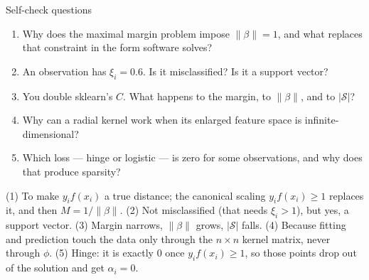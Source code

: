 \documentclass[aspectratio=169,11pt]{beamer}
\begin{document}
\begin{frame}{Self-check questions}
  \scriptsize
  \begin{readme}
    \begin{enumerate}
      \item Why does the maximal margin problem impose $\|\beta\|=1$, and what
            replaces that constraint in the form software solves?
      \item An observation has $\xi_i = 0.6$. Is it misclassified? Is it a
            support vector?
      \item You double sklearn's $C$. What happens to the margin, to
            $\|\beta\|$, and to $|\mathcal S|$?
      \item Why can a radial kernel work when its enlarged feature space is
            infinite-dimensional?
      \item Which loss --- hinge or logistic --- is zero for some observations,
            and why does that produce sparsity?
    \end{enumerate}
  \end{readme}
  \begin{takeaway}[Answers]
    (1) To make $y_if(x_i)$ a true distance; the canonical scaling
    $y_if(x_i)\ge1$ replaces it, and then $M=1/\|\beta\|$.
    (2) Not misclassified (that needs $\xi_i>1$), but yes, a support vector.
    (3) Margin narrows, $\|\beta\|$ grows, $|\mathcal S|$ falls.
    (4) Because fitting and prediction touch the data only through the
    $n\times n$ kernel matrix, never through $\phi$.
    (5) Hinge: it is exactly $0$ once $y_if(x_i)\ge1$, so those points drop out
    of the solution and get $\alpha_i=0$.
  \end{takeaway}
\end{frame}
\end{document}
